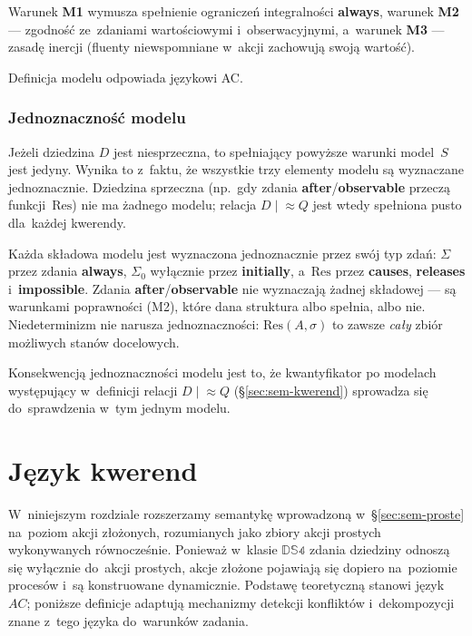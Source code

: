\documentclass[11pt,a4paper]{article}
\newif\ifshowbib
\newcommand{\bibonly}[1]{\ifshowbib#1\fi}
\renewcommand{\cite}[2][]{\unskip}%
\theoremstyle{definition}
\begin{document}
Warunek \textbf{M1} wymusza spełnienie ograniczeń integralności \textbf{always}, warunek \textbf{M2} --- zgodność ze~zdaniami wartościowymi i~obserwacyjnymi, a~warunek \textbf{M3} --- zasadę inercji (fluenty niewspomniane w~akcji zachowują swoją wartość).

Definicja modelu odpowiada językowi AC\bibonly{~\cite{rw05}}.

\subsubsection{Jednoznaczność modelu}
\label{sec:jednoznacznosc-modelu}

Jeżeli dziedzina $D$ jest niesprzeczna, to spełniający powyższe warunki model~$S$ jest jedyny. Wynika to z~faktu, że wszystkie trzy elementy modelu są wyznaczane jednoznacznie. Dziedzina sprzeczna (np.\ gdy zdania \textbf{after}/\textbf{observable} przeczą funkcji~$\mathrm{Res}$) nie ma żadnego modelu; relacja $D \mid\!\approx Q$ jest wtedy spełniona pusto dla~każdej kwerendy.

Każda składowa modelu jest wyznaczona jednoznacznie przez swój typ zdań: $\Sigma$ przez zdania \textbf{always}, $\Sigma_0$ wyłącznie przez \textbf{initially}, a~$\mathrm{Res}$ przez \textbf{causes}, \textbf{releases} i~\textbf{impossible}. Zdania \textbf{after}/\textbf{observable} nie wyznaczają żadnej składowej --- są warunkami poprawności (M2), które dana struktura albo spełnia, albo nie. Niedeterminizm nie narusza jednoznaczności: $\mathrm{Res}(A,\sigma)$ to zawsze \emph{cały} zbiór możliwych stanów docelowych.

Konsekwencją jednoznaczności modelu jest to, że kwantyfikator po modelach występujący w~definicji relacji $D \mid\!\approx Q$ (\S\ref{sec:sem-kwerend}) sprowadza się do~sprawdzenia w~tym jednym modelu.

\section{Język kwerend}
\label{sec:jezyk-kwerend}

W~niniejszym rozdziale rozszerzamy semantykę wprowadzoną w~\S\ref{sec:sem-proste} na~poziom
akcji złożonych, rozumianych jako zbiory akcji prostych wykonywanych
równocześnie. Ponieważ w~klasie $\mathbb{DS4}$ zdania dziedziny
odnoszą się wyłącznie do~akcji prostych, akcje złożone pojawiają się
dopiero na~poziomie procesów i~są konstruowane dynamicznie. Podstawę
teoretyczną stanowi język~$AC$\bibonly{~\cite{rw05}}; poniższe definicje
adaptują mechanizmy detekcji konfliktów i~dekompozycji znane z~tego języka
do~warunków zadania.
\end{document}
